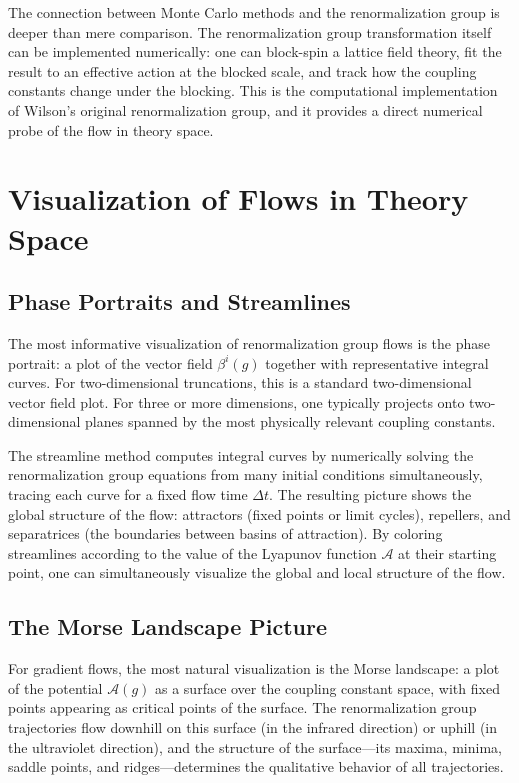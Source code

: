 \documentclass[11pt, twoside, openright]{book}
\theoremstyle{dotted}
\theoremstyle{definition}
\begin{document}
The connection between Monte Carlo methods and the renormalization group is deeper
than mere comparison. The renormalization group transformation itself can be
implemented numerically: one can block-spin a lattice field theory, fit the
result to an effective action at the blocked scale, and track how the coupling
constants change under the blocking. This is the computational implementation of
Wilson's original renormalization group, and it provides a direct numerical probe
of the flow in theory space.

\chapter{Visualization of Flows in Theory Space}
\label{ch:visualization}

\section{Phase Portraits and Streamlines}

The most informative visualization of renormalization group flows is the phase
portrait: a plot of the vector field $\beta^i(g)$ together with representative
integral curves. For two-dimensional truncations, this is a standard two-dimensional
vector field plot. For three or more dimensions, one typically projects onto
two-dimensional planes spanned by the most physically relevant coupling constants.

The streamline method computes integral curves by numerically solving the
renormalization group equations from many initial conditions simultaneously, tracing
each curve for a fixed flow time $\Delta t$. The resulting picture shows the global
structure of the flow: attractors (fixed points or limit cycles), repellers, and
separatrices (the boundaries between basins of attraction). By coloring streamlines
according to the value of the Lyapunov function $\mathcal{A}$ at their starting
point, one can simultaneously visualize the global and local structure of the flow.

\section{The Morse Landscape Picture}

For gradient flows, the most natural visualization is the Morse landscape: a
plot of the potential $\mathcal{A}(g)$ as a surface over the coupling constant
space, with fixed points appearing as critical points of the surface. The
renormalization group trajectories flow downhill on this surface (in the infrared
direction) or uphill (in the ultraviolet direction), and the structure of the
surface---its maxima, minima, saddle points, and ridges---determines the qualitative
behavior of all trajectories.
\end{document}
